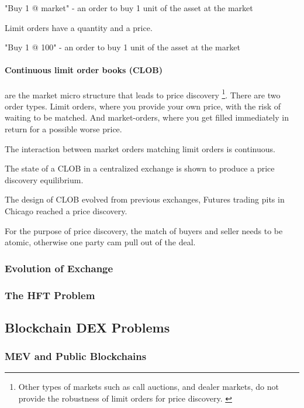 \documentclass[12pt]{article}
\begin{document}
\begin{enumerate*}
    \item "Buy 1 @ market" - an order to buy 1 unit of the asset at the market  
\end{enumerate*}

Limit orders have a quantity and a price. 

\begin{enumerate*}
    \item "Buy 1 @ 100" - an order to buy 1 unit of the asset at the market  
\end{enumerate*}


\paragraph*{Continuous limit order books (CLOB)} are the market micro structure that leads to price discovery \footnote{Other types of markets such as call auctions, and dealer markets, do not provide the robustness of limit orders for price discovery. \cite{RePEc:hal:journl:hal-00459785}}. There are two order types. Limit orders, where you provide your own price, with the risk of waiting to be matched. And market-orders, where you get filled immediately in return for a possible worse price.

The interaction between market orders matching limit orders is continuous. 

The state of a CLOB in a centralized exchange is shown to produce a price discovery equilibrium. 

The design of CLOB evolved from previous exchanges, Futures trading pits in Chicago reached a price discovery. 

For the purpose of price discovery, the match of buyers and seller needs to be atomic, otherwise one party cam pull out of the deal. 


\subsubsection*{Evolution of Exchange}
 

\subsubsection*{The HFT Problem}
\subsection*{Blockchain DEX Problems}
\subsubsection*{MEV and Public Blockchains}
\end{document}
